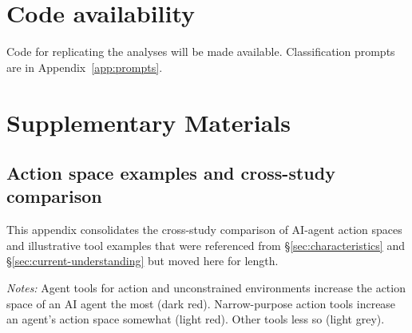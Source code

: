 \documentclass[manuscript,screen,nonacm,oneside]{acmart}
\begin{document}
\section*{Code availability}

Code for replicating the analyses will be made available. Classification prompts are in Appendix~\ref{app:prompts}.




\appendix

\section{Supplementary Materials}

\subsection{Action space examples and cross-study comparison}
\label{app:action-space-tables}

This appendix consolidates the cross-study comparison of AI-agent action spaces and illustrative tool examples that were referenced from \S\ref{sec:characteristics} and \S\ref{sec:current-understanding} but moved here for length.

\begin{table}[htbp]
\centering
\caption{AI agent tool examples by generality and direct impact.}
\small
{}
\begin{minipage}{\linewidth}
\scriptsize
\textit{Notes: }{Agent tools for action and unconstrained environments increase the action space of an AI agent the most (dark red). Narrow-purpose action tools increase an agent's action space somewhat (light red). Other tools less so (light grey).}
\end{minipage}
\label{tab:agency}
\end{table}
\end{document}
